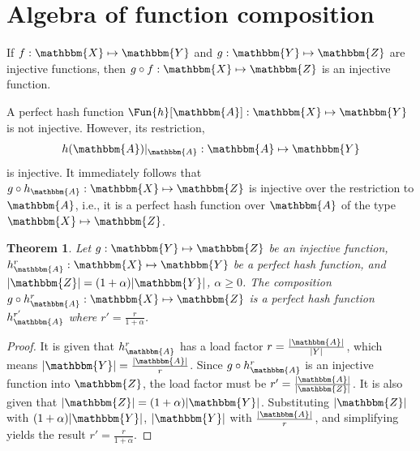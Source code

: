 \documentclass[hidelinks,11pt,final]{article}
\newcommand{\envnumstyle}{section}
\theoremstyle{plain}
\newtheorem{theorem}{Theorem}[\envnumstyle]
\begin{document}

%

\section{Algebra of function composition}
If $f : \mathbbm{X} \mapsto \mathbbm{Y}$ and $g : \mathbbm{Y} \mapsto \mathbbm{Z}$ are injective functions, then $g \circ f : \mathbbm{X} \mapsto \mathbbm{Z}$ is an injective function.

A perfect hash function $\Fun{h}[\mathbbm{A}] : \mathbbm{X} \mapsto \mathbbm{Y}$ is not injective.
However, its restriction,
\begin{equation}
	h(\mathbbm{A})|_{\mathbbm{A}} : \mathbbm{A} \mapsto \mathbbm{Y}
\end{equation}
is injective. It immediately follows that $g \circ h_\mathbbm{A} : \mathbbm{X} \mapsto \mathbbm{Z}$ is injective over the restriction to $\mathbbm{A}$, i.e., it is a perfect hash function over $\mathbbm{A}$ of the type $\mathbbm{X} \mapsto \mathbbm{Z}$.

\begin{theorem}
Let $g : \mathbbm{Y} \mapsto \mathbbm{Z}$ be an injective function, $h_\mathbbm{A}^r : \mathbbm{X} \mapsto \mathbbm{Y}$ be a perfect hash function, and  $|\mathbbm{Z}| = (1 + \alpha) |\mathbbm{Y}|$, $\alpha \geq 0$.
The composition $g \circ h_\mathbbm{A}^r : \mathbbm{X} \mapsto \mathbbm{Z}$ is a perfect hash function $h_\mathbbm{A}^{r'}$ where $r' = \frac{r}{1+\alpha}$.
\end{theorem}
\begin{proof}
It is given that $h_\mathbbm{A}^r$ has a load factor $r = \frac{|\mathbbm{A}|}{|Y|}$, which means $|\mathbbm{Y}| = \frac{|\mathbbm{A}|}{r}$.
Since $g \circ h_\mathbbm{A}^r$ is an injective function into $\mathbbm{Z}$, the load factor must be $r' = \frac{|\mathbbm{A}|}{|\mathbbm{Z}|}$.
It is also given that $|\mathbbm{Z}| = (1+\alpha) |\mathbbm{Y}|$.
Substituting $|\mathbbm{Z}|$ with $(1+\alpha) |\mathbbm{Y}|$, $|\mathbbm{Y}|$ with $\frac{|\mathbbm{A}|}{r}$, and simplifying yields the result $r' = \frac{r}{1+\alpha}$.
\end{proof}
\end{document}
